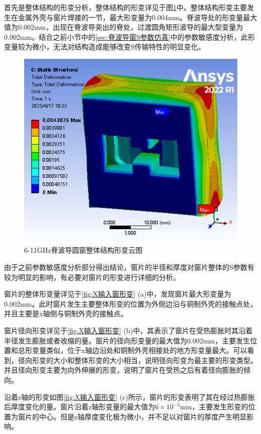 \documentclass[master]{thesis-uestc}
\begin{document}
首先是整体结构的形变分析，整体结构的形变详见于图\ref{fig:X整体结构形变}中。整体结构形变主要发生在金属外壳与窗片焊接的一节，最大形变量为0.004mm。脊波导处的形变量最大值为0.002mm，出现在脊波导突出的脊处，过渡圆角矩形波导的最大型变量为0.002mm。结合之前小节中的\ref{sec:脊波导窗S参数仿真}中的参数敏感度分析，此形变量较为微小，无法对结构造成能够改变S传输特性的明显变化。
\begin{figure}[!htb]
    \centering
    \includegraphics[width=0.45\linewidth]{pic/chapter3/X输入窗与波导.png}
    \caption{6-11GHz脊波导圆窗整体结构形变云图}
    \label{fig:X整体结构形变}
\end{figure}

由于之前参数敏感度分析部分得出结论，窗片的半径和厚度对窗片整体的S参数有较为明显的影响，有必要对窗片的形变进行详细的分析。

窗片的整体形变量详见于\ref{fig:X输入窗形变} (a)中，发现窗片最大形变量为0.002mm。此时窗片发生主要整体形变的位置为外侧边沿与铜制外壳的接触点处，并且主要是x轴侧与铜制外壳的接触点。

窗片径向形变详见于\ref{fig:X输入窗形变} (b)中，其表示了窗片在受热膨胀时其沿着半径发生膨胀或者收缩的量。窗片的径向形变量的最大值为0.002mm，主要发生位置和总形变量类似，位于x轴边沿处和铜制外壳相接处的地方形变量最大。可以看到，径向形变的大小和整体形变的大小相当，说明径向形变为最主要的形变类型。并且径向形变主要为向外伸展的形变，说明了窗片在受热之后有着径向膨胀的倾向。

沿着z轴的形变如图\ref{fig:X输入窗形变} (c)所示，窗片的形变表明了其在经过热膨胀后厚度变化的量。窗片沿着z轴形变量的最大值为\(6 \times 10^{-5}\)mm，主要发生形变的位置为窗片的中心。但是z轴厚度变化极为微小，并不足以对窗片的厚度产生明显影响。
\end{document}
